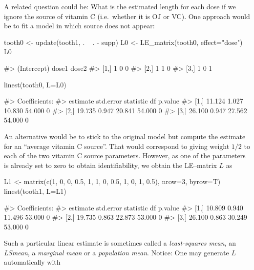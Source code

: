 A related question could be: What is the estimated length for each dose
if we ignore the source of vitamin C (i.e.~whether it is OJ or VC). One
approach would be to fit a model in which source does not appear:

\begin{Schunk}
\begin{Sinput}
tooth0 <- update(tooth1, . ~ . - supp)
L0 <- LE_matrix(tooth0, effect="dose")
L0
\end{Sinput}
\begin{Soutput}
#>      (Intercept) dose1 dose2
#> [1,]           1     0     0
#> [2,]           1     1     0
#> [3,]           1     0     1
\end{Soutput}
\begin{Sinput}
linest(tooth0, L=L0)
\end{Sinput}
\begin{Soutput}
#> Coefficients:
#>      estimate std.error statistic     df p.value
#> [1,]   11.124     1.027    10.830 54.000       0
#> [2,]   19.735     0.947    20.841 54.000       0
#> [3,]   26.100     0.947    27.562 54.000       0
\end{Soutput}
\end{Schunk}

An alternative would be to stick to the original model but compute the
estimate for an ``average vitamin C source''. That would correspond to
giving weight \(1/2\) to each of the two vitamin C source parameters.
However, as one of the parameters is already set to zero to obtain
identifiability, we obtain the LE--matrix \(L\) as

\begin{Schunk}
\begin{Sinput}
L1 <- matrix(c(1, 0, 0, 0.5, 
               1, 1, 0, 0.5,
               1, 0, 1, 0.5), nrow=3, byrow=T)
linest(tooth1, L=L1)
\end{Sinput}
\begin{Soutput}
#> Coefficients:
#>      estimate std.error statistic     df p.value
#> [1,]   10.809     0.940    11.496 53.000       0
#> [2,]   19.735     0.863    22.873 53.000       0
#> [3,]   26.100     0.863    30.249 53.000       0
\end{Soutput}
\end{Schunk}

Such a particular linear estimate is sometimes called a
\emph{least-squares mean}, an \emph{LSmean}, a \emph{marginal mean} or a
\emph{population mean}. Notice: One may generate \(L\) automatically
with

